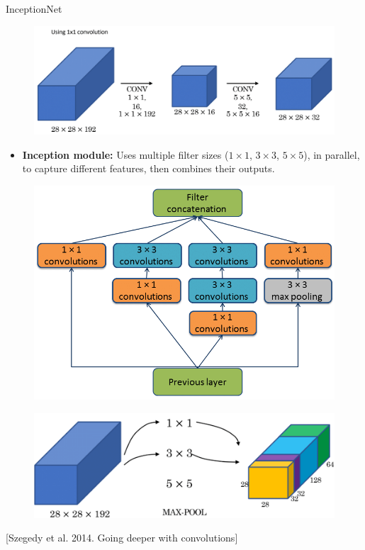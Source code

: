 \begin{frame}[allowframebreaks]{InceptionNet}
\framebreak

    \begin{figure}
        \centering
        \includegraphics[width=1.0\textwidth,height=0.8\textheight,keepaspectratio]{images/cnn/inception-sol-1.png}
    \end{figure}

\framebreak

    \begin{itemize}
        \item \textbf{Inception module:} Uses multiple filter sizes ($1\times1$, $3\times3$, $5\times5$), in parallel, to capture different features, then combines their outputs.
    \end{itemize}

    \begin{figure}
        \centering
        \includegraphics[width=1.0\textwidth,height=0.8\textheight,keepaspectratio]{images/cnn/inception_mod.png}
    \end{figure}

\framebreak

    \begin{figure}
        \centering
        \includegraphics[width=1.0\textwidth,height=0.8\textheight,keepaspectratio]{images/cnn/inception-block.png}
    \end{figure}
    \vspace{2em}
    [Szegedy et al. 2014. Going deeper with convolutions]
\end{frame}